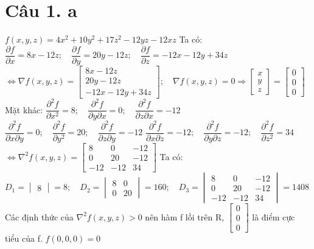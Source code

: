 \documentclass[11pt]{article}
\begin{document}
\section*{Câu 1. a}
$ f(x, y, z) = 4x^2 + 10y^2 + 17z^2 - 12yz - 12xz $
\newline Ta có: $ \dfrac{\partial f}{\partial x} = 8x - 12z; \quad \dfrac{\partial f}{\partial y} = 20y - 12z; \quad \dfrac{\partial f}{\partial z} = -12x -12y + 34z $
\newline $ \Leftrightarrow \nabla f(x, y, z) = \begin{bmatrix}
    8x - 12z \\
    20y - 12z \\
    -12x - 12y + 34z
\end{bmatrix}; \quad \nabla f(x, y, z) = 0 \Rightarrow \begin{bmatrix}
    x \\ y \\ z
\end{bmatrix} = \begin{bmatrix}
    0 \\ 0 \\ 0
\end{bmatrix} $
\newline Mặt khác:
\newline $ \dfrac{\partial^2 f}{\partial x^2} = 8; \quad \dfrac{\partial^2 f}{\partial y \partial x} = 0; \quad \dfrac{\partial^2 f}{\partial z \partial x} = -12 $
\newline $ \dfrac{\partial^2 f}{\partial x \partial y} = 0; \quad \dfrac{\partial^2 f}{\partial y^2} = 20; \quad \dfrac{\partial^2 f}{\partial z \partial y} = -12 $
\newline $ \dfrac{\partial^2 f}{\partial x \partial z} = -12; \quad \dfrac{\partial^2 f}{\partial y \partial z} = -12; \quad \dfrac{\partial^2 f}{\partial z^2} = 34 $
\newline $ \Leftrightarrow \nabla^2 f(x, y, z) = \begin{bmatrix}
    8 & 0 & -12 \\
    0 & 20 & -12 \\
    -12 & -12 & 34
\end{bmatrix} $
\newline Ta có: $ D_1 = \begin{vmatrix} 8 \end{vmatrix} = 8; \quad D_2 = \begin{vmatrix}
    8 & 0 \\
    0 & 20
\end{vmatrix} = 160; \quad D_3 = \begin{vmatrix}
    8 & 0 & -12 \\
    0 & 20 & -12 \\
    -12 & -12 & 34
\end{vmatrix} = 1408 $
\newline Các định thức của $ \nabla^2 f(x, y, z) > 0 $ nên hàm f lồi trên R, $ \begin{bmatrix} 0 \\ 0 \\ 0 \end{bmatrix} $ là điểm cực tiểu của f. $ f(0, 0, 0) = 0 $
\end{document}
